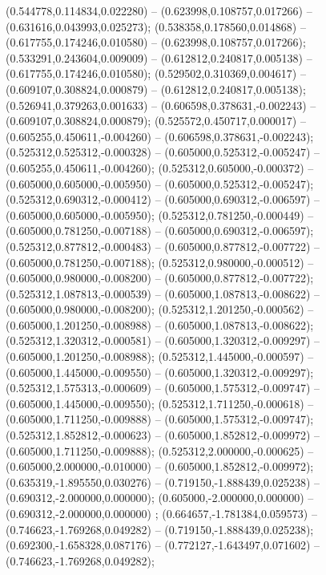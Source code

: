  (0.544778,0.114834,0.022280) -- (0.623998,0.108757,0.017266) -- (0.631616,0.043993,0.025273);
 (0.538358,0.178560,0.014868) -- (0.617755,0.174246,0.010580) -- (0.623998,0.108757,0.017266);
 (0.533291,0.243604,0.009009) -- (0.612812,0.240817,0.005138) -- (0.617755,0.174246,0.010580);
 (0.529502,0.310369,0.004617) -- (0.609107,0.308824,0.000879) -- (0.612812,0.240817,0.005138);
 (0.526941,0.379263,0.001633) -- (0.606598,0.378631,-0.002243) -- (0.609107,0.308824,0.000879);
 (0.525572,0.450717,0.000017) -- (0.605255,0.450611,-0.004260) -- (0.606598,0.378631,-0.002243);
 (0.525312,0.525312,-0.000328) -- (0.605000,0.525312,-0.005247) -- (0.605255,0.450611,-0.004260);
 (0.525312,0.605000,-0.000372) -- (0.605000,0.605000,-0.005950) -- (0.605000,0.525312,-0.005247);
 (0.525312,0.690312,-0.000412) -- (0.605000,0.690312,-0.006597) -- (0.605000,0.605000,-0.005950);
 (0.525312,0.781250,-0.000449) -- (0.605000,0.781250,-0.007188) -- (0.605000,0.690312,-0.006597);
 (0.525312,0.877812,-0.000483) -- (0.605000,0.877812,-0.007722) -- (0.605000,0.781250,-0.007188);
 (0.525312,0.980000,-0.000512) -- (0.605000,0.980000,-0.008200) -- (0.605000,0.877812,-0.007722);
 (0.525312,1.087813,-0.000539) -- (0.605000,1.087813,-0.008622) -- (0.605000,0.980000,-0.008200);
 (0.525312,1.201250,-0.000562) -- (0.605000,1.201250,-0.008988) -- (0.605000,1.087813,-0.008622);
 (0.525312,1.320312,-0.000581) -- (0.605000,1.320312,-0.009297) -- (0.605000,1.201250,-0.008988);
 (0.525312,1.445000,-0.000597) -- (0.605000,1.445000,-0.009550) -- (0.605000,1.320312,-0.009297);
 (0.525312,1.575313,-0.000609) -- (0.605000,1.575312,-0.009747) -- (0.605000,1.445000,-0.009550);
 (0.525312,1.711250,-0.000618) -- (0.605000,1.711250,-0.009888) -- (0.605000,1.575312,-0.009747);
 (0.525312,1.852812,-0.000623) -- (0.605000,1.852812,-0.009972) -- (0.605000,1.711250,-0.009888);
 (0.525312,2.000000,-0.000625) -- (0.605000,2.000000,-0.010000) -- (0.605000,1.852812,-0.009972);
 (0.635319,-1.895550,0.030276) -- (0.719150,-1.888439,0.025238) -- (0.690312,-2.000000,0.000000);
 (0.605000,-2.000000,0.000000) -- (0.690312,-2.000000,0.000000) ;
 (0.664657,-1.781384,0.059573) -- (0.746623,-1.769268,0.049282) -- (0.719150,-1.888439,0.025238);
 (0.692300,-1.658328,0.087176) -- (0.772127,-1.643497,0.071602) -- (0.746623,-1.769268,0.049282);
